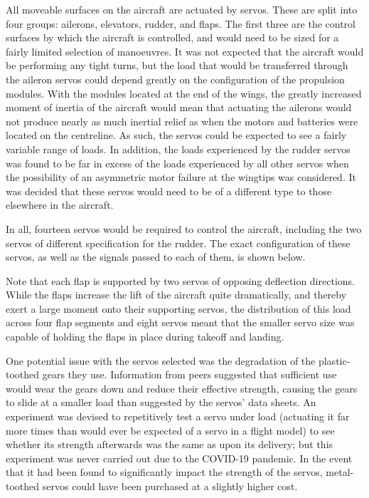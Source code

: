 \documentclass[../../main.tex]{subfiles}
\begin{document}
All moveable surfaces on the aircraft are actuated by servos.
These are split into four groups: ailerons, elevators, rudder, and flaps.
The first three are the control surfaces by which the aircraft is controlled, and would need to be sized for a fairly limited selection of manoeuvres.
It was not expected that the aircraft would be performing any tight turns, but the load that would be transferred through the aileron servos could depend greatly on the configuration of the propulsion modules.
With the modules located at the end of the wings, the greatly increased moment of inertia of the aircraft would mean that actuating the ailerons would not produce nearly as much inertial relief as when the motors and batteries were located on the centreline.
As such, the servos could be expected to see a fairly variable range of loads.
In addition, the loads experienced by the rudder servos was found to be far in excess of the loads experienced by all other servos when the possibility of an asymmetric motor failure at the wingtips was considered.
It was decided that these servos would need to be of a different type to those elsewhere in the aircraft. 

In all, fourteen servos would be required to control the aircraft, including the two servos of different specification for the rudder.
The exact configuration of these servos, as well as the signals passed to each of them, is shown below. 


Note that each flap is supported by two servos of opposing deflection directions.
While the flaps increase the lift of the aircraft quite dramatically, and thereby exert a large moment onto their supporting servos, the distribution of this load across four flap segments and eight servos meant that the smaller servo size was capable of holding the flaps in place during takeoff and landing. 

One potential issue with the servos selected was the degradation of the plastic-toothed gears they use.
Information from peers suggested that sufficient use would wear the gears down and reduce their effective strength, causing the gears to slide at a smaller load than suggested by the servos’ data sheets.
An experiment was devised to repetitively test a servo under load (actuating it far more times than would ever be expected of a servo in a flight model) to see whether its strength afterwards was the same as upon its delivery; but this experiment was never carried out due to the COVID-19 pandemic.
In the event that it had been found to significantly impact the strength of the servos, metal-toothed servos could have been purchased at a slightly higher cost. 
\end{document}
